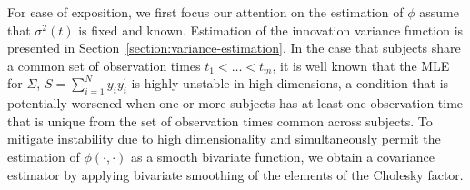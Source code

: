 \documentclass[12pt]{article}
\theoremstyle{definition}
\begin{document}
 

%
%
 





For ease of exposition, we first focus our attention on the estimation of $\phi$ assume that $\sigma^2\left(t\right)$ is fixed and known. Estimation of the innovation variance function is presented in Section~\ref{section:variance-estimation}. In the case that subjects share a common set of observation times $t_1 < \dots < t_m$,  it is well known that the MLE for $\Sigma$, $S = \sum_{i=1}^N y_i y_i^\prime$ is highly unstable in high dimensions, a condition that is potentially worsened when one or more subjects has at least one observation time that is unique from the set of observation times common across subjects. To mitigate instability due to high dimensionality and simultaneously permit the estimation of $\phi\left(\cdot,\cdot\right)$ as a smooth bivariate function, we obtain a covariance estimator by applying bivariate smoothing of the elements of the Cholesky factor. 
\end{document}

